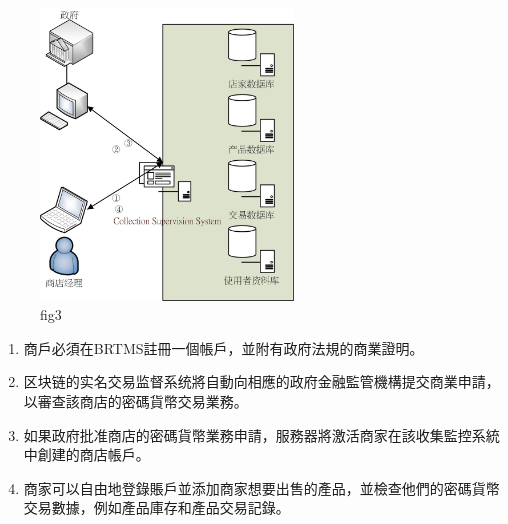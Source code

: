 	\begin{figure}[h]
		\centering
		\includegraphics[width = 0.6\textwidth]{fig3.png}
		\caption{fig3}\label{fig3}
	\end{figure}

	\begin{enumerate}
		\item 商戶必須在BRTMS註冊一個帳戶，並附有政府法規的商業證明。
		\item 区块链的实名交易监督系统將自動向相應的政府金融監管機構提交商業申請，以審查該商店的密碼貨幣交易業務。
		\item 如果政府批准商店的密碼貨幣業務申請，服務器將激活商家在該收集監控系統中創建的商店帳戶。
		\item 商家可以自由地登錄賬戶並添加商家想要出售的產品，並檢查他們的密碼貨幣交易數據，例如產品庫存和產品交易記錄。
	\end{enumerate}

